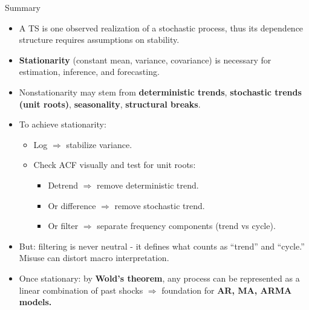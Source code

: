\documentclass{beamer}
\begin{document}
\begin{frame}{Summary}
\small
\begin{itemize}
  \item A TS is one observed realization of a stochastic process, thus its dependence structure requires assumptions on stability.
  \item \textbf{Stationarity} (constant mean, variance, covariance) is necessary for estimation, inference, and forecasting.
  \item Nonstationarity may stem from \textbf{deterministic trends}, \textbf{stochastic trends (unit roots)}, \textbf{seasonality}, \textbf{structural breaks}.
  \item To achieve stationarity:
    \begin{itemize}
        \item Log $\Rightarrow$ stabilize variance.
        \item Check ACF visually and test for unit roots:
        \begin{itemize}
            \item Detrend $\Rightarrow$ remove deterministic trend.
        \end{itemize}
        \begin{itemize}
            \item Or difference $\Rightarrow$ remove stochastic trend.
        \end{itemize}  
        \begin{itemize}
            \item Or filter $\Rightarrow$ separate frequency components (trend vs cycle).
        \end{itemize}
    \end{itemize}
  \item But: filtering is never neutral - it defines what counts as “trend” and “cycle.”  Misuse can distort macro interpretation.
  \item Once stationary: by \textbf{Wold’s theorem}, any process can be represented  as a linear combination of past shocks $\Rightarrow$ foundation for \textbf{AR, MA, ARMA models.}
\end{itemize}
\end{frame}
\end{document}
